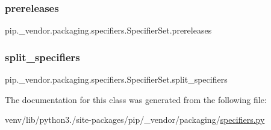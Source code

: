\subsubsection{\texorpdfstring{prereleases}{prereleases}}
{\footnotesize\ttfamily pip.\+\_\+vendor.\+packaging.\+specifiers.\+Specifier\+Set.\+prereleases\hspace{0.3cm}{\ttfamily [static]}}

\mbox{\label{classpip_1_1__vendor_1_1packaging_1_1specifiers_1_1SpecifierSet_a2d40c6012d03bb082bbd1c9505355ace}} 
\subsubsection{\texorpdfstring{split\+\_\+specifiers}{split\_specifiers}}
{\footnotesize\ttfamily pip.\+\_\+vendor.\+packaging.\+specifiers.\+Specifier\+Set.\+split\+\_\+specifiers\hspace{0.3cm}{\ttfamily [static]}}



The documentation for this class was generated from the following file\+:\begin{DoxyCompactItemize}
\item 
venv/lib/python3./site-\/packages/pip/\+\_\+vendor/packaging/\hyperlink{pip_2__vendor_2packaging_2specifiers_8py}{specifiers.\+py}\end{DoxyCompactItemize}

